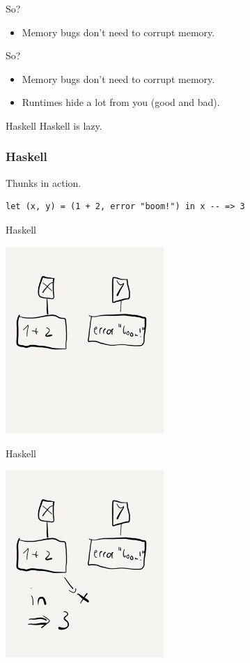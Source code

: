 \documentclass[aspectratio=169,14pt]{beamer}
\begin{document}
  \begin{frame}{So?}
    \begin{itemize}
      \item Memory bugs don’t need to corrupt memory.
    \end{itemize}
  \end{frame}
  \begin{frame}{So?}
    \begin{itemize}
      \item Memory bugs don’t need to corrupt memory.
      \item Runtimes hide a lot from you (good and bad).
    \end{itemize}
  \end{frame}
  \begin{frame}{Haskell}
    Haskell is lazy.
  \end{frame}
  \begin{frame}[fragile]
    \frametitle{Haskell}
    \begin{listing}[H]
      \caption{Thunks in action.}
      \begin{verbatim}
let (x, y) = (1 + 2, error "boom!") in x -- => 3
      \end{verbatim}
    \end{listing}
  \end{frame}
  \begin{frame}{Haskell}
    \begin{center}
      \includegraphics[width=6cm]{lazy_before}
    \end{center}
  \end{frame}
  \begin{frame}{Haskell}
    \begin{center}
      \includegraphics[width=6cm]{lazy_after}
    \end{center}
  \end{frame}
\end{document}
